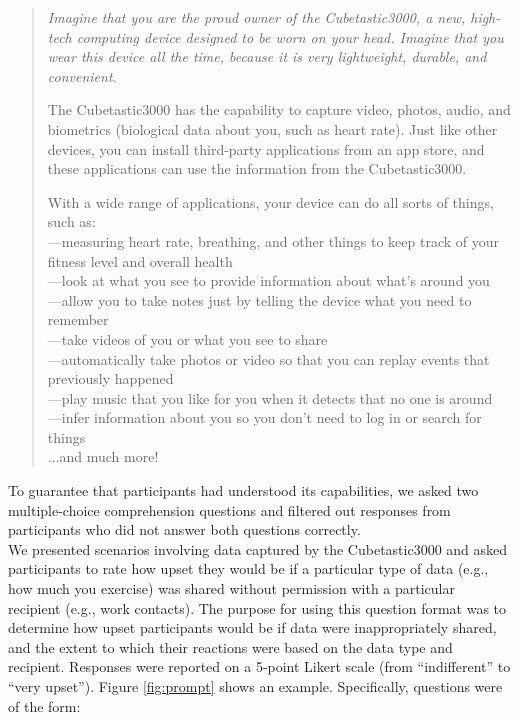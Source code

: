 \documentclass[conference]{IEEEtran}
\begin{document}
\begin{quotation}
{\it Imagine that you are the proud owner of the Cubetastic3000, a new, high-tech computing device designed to be worn on your head. Imagine that you wear this device all the time, because it is very lightweight, durable, and convenient.

The Cubetastic3000 has the capability to capture video, photos, audio, and biometrics (biological data about you, such as heart rate). Just like other devices, you can install third-party applications from an app store, and these applications can use the information from the Cubetastic3000.

With a wide range of applications, your device can do all sorts of things, such as:\\

\noindent---measuring heart rate, breathing, and other things to keep track of your fitness level and overall health\\
\noindent---look at what you see to provide information about what's around you\\
\noindent---allow you to take notes just by telling the device what you need to remember\\
\noindent---take videos of you or what you see to share\\
\noindent---automatically take photos or video so that you can replay events that previously happened\\
\noindent---play music that you like for you when it detects that no one is around\\
\noindent---infer information about you so you don't need to log in or search for things\\
\noindent ...and much more!}
\end{quotation}

To guarantee that participants had understood its capabilities, we asked two multiple-choice comprehension questions and filtered out responses from participants who did not answer both questions correctly.\\

We presented scenarios involving data captured by the Cubetastic3000 and asked participants to rate how upset they would be if a particular type of data (e.g., how much you exercise) was shared without permission with a particular recipient (e.g., work contacts). The purpose for using this question format was to determine how upset participants would be if data were inappropriately shared, and the extent to which their reactions were based on the data type and recipient. Responses were reported on a 5-point Likert scale (from ``indifferent'' to ``very upset''). Figure \ref{fig:prompt} shows an example.  Specifically, questions were of the form: 
\end{document}
